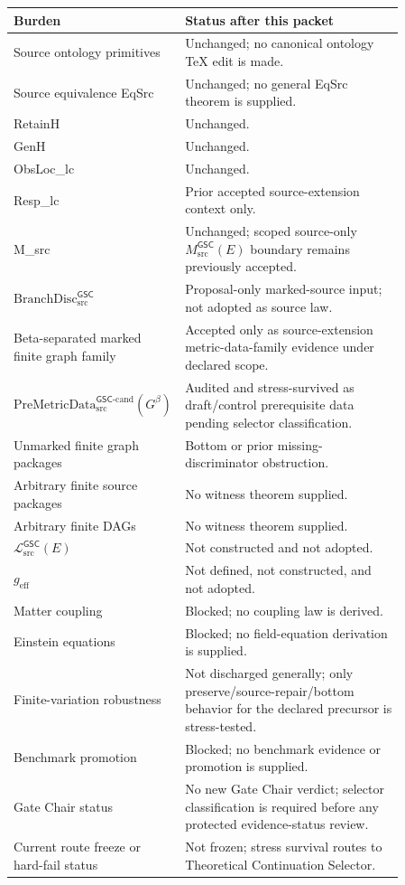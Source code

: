 \documentclass[11pt]{article}
\newcommand{\PreMetricData}{\mathrm{PreMetricData}_{\mathrm{src}}^{\mathsf{GSC}\mbox{-}\mathrm{cand}}}
\newcommand{\MetricData}{\mathcal{L}_{\mathrm{src}}^{\mathsf{GSC}}}
\newcommand{\BranchDisc}{\mathrm{BranchDisc}_{\mathrm{src}}^{\mathsf{GSC}}}
\newcommand{\Gbeta}{G^\beta}
\newcommand{\geff}{g_{\mathrm{eff}}}
\begin{document}
\begin{longtable}{p{0.30\linewidth}p{0.56\linewidth}}
\toprule
Burden & Status after this packet \\
\midrule
Source ontology primitives & Unchanged; no canonical ontology TeX edit is made. \\
Source equivalence EqSrc & Unchanged; no general EqSrc theorem is supplied. \\
RetainH & Unchanged. \\
GenH & Unchanged. \\
ObsLoc\_lc & Unchanged. \\
Resp\_lc & Prior accepted source-extension context only. \\
M\_src & Unchanged; scoped source-only \(M_{\mathrm{src}}^{\mathsf{GSC}}(E)\) boundary remains previously accepted. \\
\(\BranchDisc\) & Proposal-only marked-source input; not adopted as source law. \\
Beta-separated marked finite graph family & Accepted only as source-extension metric-data-family evidence under declared scope. \\
\(\PreMetricData(\Gbeta)\) & Audited and stress-survived as draft/control prerequisite data pending selector classification. \\
Unmarked finite graph packages & Bottom or prior missing-discriminator obstruction. \\
Arbitrary finite source packages & No witness theorem supplied. \\
Arbitrary finite DAGs & No witness theorem supplied. \\
\(\MetricData(E)\) & Not constructed and not adopted. \\
\(\geff\) & Not defined, not constructed, and not adopted. \\
Matter coupling & Blocked; no coupling law is derived. \\
Einstein equations & Blocked; no field-equation derivation is supplied. \\
Finite-variation robustness & Not discharged generally; only preserve/source-repair/bottom behavior for the declared precursor is stress-tested. \\
Benchmark promotion & Blocked; no benchmark evidence or promotion is supplied. \\
Gate Chair status & No new Gate Chair verdict; selector classification is required before any protected evidence-status review. \\
Current route freeze or hard-fail status & Not frozen; stress survival routes to Theoretical Continuation Selector. \\
\bottomrule
\end{longtable}
\end{document}
